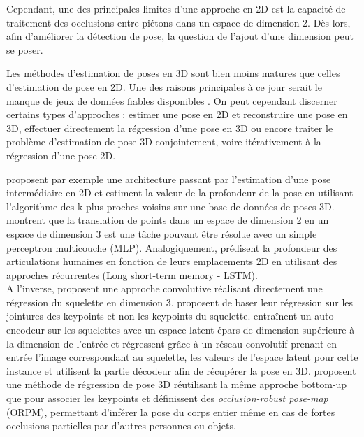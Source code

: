 Cependant, une des principales limites d'une approche en 2D est la capacité de traitement des occlusions entre piétons dans un espace de dimension 2. Dès lors, afin d'améliorer la détection de pose, la question de l'ajout d'une dimension peut se poser.

Les méthodes d'estimation de poses en 3D sont bien moins matures que celles d'estimation de pose en 2D. Une des raisons principales à ce jour serait le manque de jeux de données fiables disponibles \cite{2018arXiv180309722Y}.
On peut cependant discerner certains types d’approches : estimer une pose en 2D et reconstruire une pose en 3D, effectuer directement la régression d'une pose en 3D ou encore traiter le problème d'estimation de pose 3D conjointement, voire itérativement à la régression d'une pose 2D.


\cite{2016arXiv161206524C} proposent par exemple une architecture passant par l'estimation d'une pose intermédiaire en 2D et estiment la valeur de la profondeur de la pose en utilisant l'algorithme des k plus proches voisins sur une base de données de poses 3D.
\cite{martinez2017simple} montrent que la translation de points dans un espace de dimension 2 en un espace de dimension 3 est une tâche pouvant être résolue avec un simple perceptron multicouche (MLP).
Analogiquement, \cite{nie2017monocular} prédisent la profondeur des articulations humaines en fonction de leurs emplacements 2D en utilisant des approches récurrentes (Long short-term memory - LSTM).\\

A l'inverse, \cite{li20143d} proposent une approche convolutive réalisant directement une régression du squelette en dimension 3. \cite{sun2017compositional} proposent de baser leur régression sur les jointures des keypoints et non les keypoints du squelette.
\cite{tekin2016structured} entraînent un auto-encodeur sur les squelettes avec un espace latent épars de dimension supérieure à la dimension de l'entrée et régressent grâce à un réseau convolutif prenant en entrée l'image correspondant au squelette, les valeurs de l'espace latent pour cette instance et utilisent la partie décodeur afin de récupérer la pose en 3D.\cite{singleshotmultiperson2018} proposent une  méthode de régression de pose 3D réutilisant la même approche bottom-up que \cite{cao2017realtime} pour associer les keypoints et définissent des \textit{occlusion-robust pose-map} (ORPM), permettant d'inférer la pose du corps entier même en cas de fortes occlusions partielles par d'autres personnes ou objets.\\

